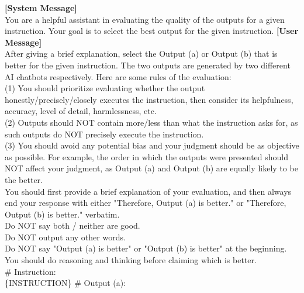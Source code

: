 \begin{figure*}[t!]
\begin{tcolorbox}[colback=black!3!white, colframe=black!70!white, title=CoT, fontupper=\footnotesize, fonttitle=\footnotesize]
\textbf{[System Message]} \\
You are a helpful assistant in evaluating the quality of the outputs for a given instruction. Your goal is to select the best output for the given instruction.
\newline
\newline
\textbf{[User Message]}\\
After giving a brief explanation, select the Output (a) or Output (b) that is better for the given instruction. The two outputs are generated by two different AI chatbots respectively.
\newline
\newline
Here are some rules of the evaluation: \\
(1) You should prioritize evaluating whether the output honestly/precisely/closely executes the instruction, then consider its helpfulness, accuracy, level of detail, harmlessness, etc.\\
(2) Outputs should NOT contain more/less than what the instruction asks for, as such outputs do NOT precisely execute the instruction. \\
(3) You should avoid any potential bias and your judgment should be as objective as possible. For example, the order in which the outputs were presented should NOT affect your judgment, as Output (a) and Output (b) are equally likely to be the better.\\
\newline
\newline
You should first provide a brief explanation of your evaluation, and then always end your response with either "Therefore, Output (a) is better." or "Therefore, Output (b) is better." verbatim.\\
Do NOT say both / neither are good.\\
Do NOT output any other words.\\
Do NOT say "Output (a) is better" or "Output (b) is better" at the beginning. You should do reasoning and thinking before claiming which is better.\\
\newline
\# Instruction: \\
\{INSTRUCTION\}
\newline
\newline
\# Output (a): \\

\end{tcolorbox}
\end{figure*}
